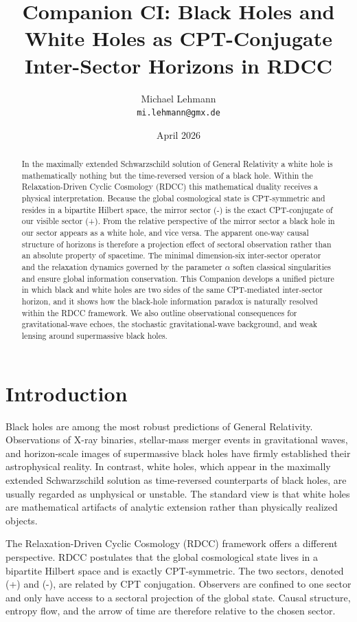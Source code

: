 \documentclass[11pt,a4paper]{article}
\title{\textbf{Companion CI: Black Holes and White Holes as CPT-Conjugate Inter-Sector Horizons in RDCC}}
\author{Michael Lehmann \\ \texttt{mi.lehmann@gmx.de}}
\date{April 2026}
\begin{document}
\maketitle

\begin{abstract}
In the maximally extended Schwarzschild solution of General Relativity a white hole is mathematically nothing but the time-reversed version of a black hole. Within the Relaxation-Driven Cyclic Cosmology (RDCC) this mathematical duality receives a physical interpretation. Because the global cosmological state is CPT-symmetric and resides in a bipartite Hilbert space, the mirror sector (-) is the exact CPT-conjugate of our visible sector (+). From the relative perspective of the mirror sector a black hole in our sector appears as a white hole, and vice versa. The apparent one-way causal structure of horizons is therefore a projection effect of sectoral observation rather than an absolute property of spacetime. The minimal dimension-six inter-sector operator and the relaxation dynamics governed by the parameter \(\alpha\) soften classical singularities and ensure global information conservation. This Companion develops a unified picture in which black and white holes are two sides of the same CPT-mediated inter-sector horizon, and it shows how the black-hole information paradox is naturally resolved within the RDCC framework. We also outline observational consequences for gravitational-wave echoes, the stochastic gravitational-wave background, and weak lensing around supermassive black holes.
\end{abstract}

\section{Introduction}

Black holes are among the most robust predictions of General Relativity. Observations of X-ray binaries, stellar-mass merger events in gravitational waves, and horizon-scale images of supermassive black holes have firmly established their astrophysical reality. In contrast, white holes, which appear in the maximally extended Schwarzschild solution as time-reversed counterparts of black holes, are usually regarded as unphysical or unstable. The standard view is that white holes are mathematical artifacts of analytic extension rather than physically realized objects.

The Relaxation-Driven Cyclic Cosmology (RDCC) framework offers a different perspective. RDCC postulates that the global cosmological state lives in a bipartite Hilbert space and is exactly CPT-symmetric. The two sectors, denoted (+) and (-), are related by CPT conjugation. Observers are confined to one sector and only have access to a sectoral projection of the global state. Causal structure, entropy flow, and the arrow of time are therefore relative to the chosen sector.
\end{document}

